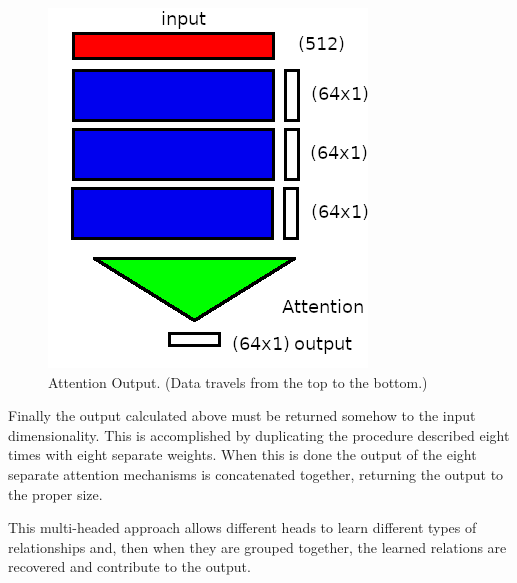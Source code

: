 \begin{figure}[H]
	\begin{center}
		
		
		\includegraphics[scale=0.5]{diagram-mat04-64}
	\end{center}
	\caption[Attention Output]{Attention Output. (Data travels from the top to the bottom.)}
	
	\label{attantion-7}
\end{figure}




Finally the output calculated above must be returned somehow to the input dimensionality. This is accomplished by duplicating the procedure described eight times with eight separate weights. When this is done the output of the eight separate attention mechanisms is concatenated together, returning the output to the proper size.

This multi-headed approach allows different heads to learn different types of relationships and, then when they are grouped together, the learned relations are recovered and contribute to the output.

